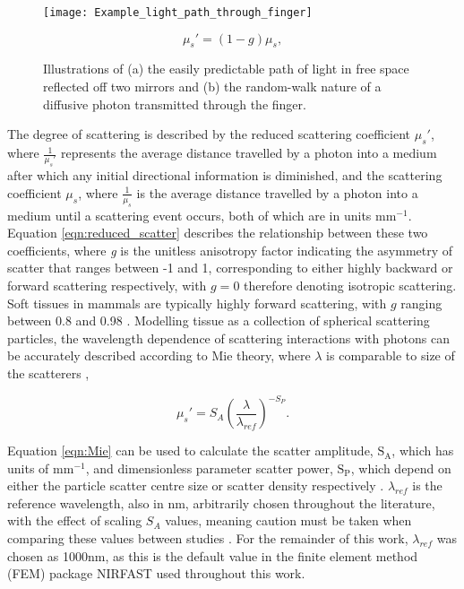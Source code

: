 \documentclass[twoside]{bhamthesis}
\theoremstyle{definition}
\begin{document}
\begin{figure}[!ht]
	\begin{minipage}{.7\textwidth}
    \centering
    \texttt{[image: Example\_light\_path\_through\_finger]}
    \caption{Illustrations of (a) the easily predictable path of light in free space reflected off two mirrors and (b) the random-walk nature of a diffusive photon transmitted through the finger.} 
    \label{fig:Random_walk}
  \end{minipage}%
  \begin{minipage}{.3\textwidth}
     \begin{equation}
\mu_s' = (1-g)\mu_s,
  \label{eqn:reduced_scatter}
    \end{equation}
  \end{minipage}
\end{figure}

The degree of scattering is described by the reduced scattering coefficient $\mu_s'$, where $\frac{1}{\mu_s'}$ represents the average distance travelled by a photon into a medium after which any initial directional information is diminished, and the scattering coefficient $\mu_s$, where $\frac{1}{\mu_s}$ is the average distance travelled by a photon into a medium until a scattering event occurs, both of which are in units mm$^{-1}$. Equation \ref{eqn:reduced_scatter} describes the relationship between these two coefficients, where \textit{g} is the unitless anisotropy factor indicating the asymmetry of scatter that ranges between -1 and 1, corresponding to either highly backward or forward scattering respectively, with $g=0$ therefore denoting isotropic scattering. Soft tissues in mammals are typically highly forward scattering, with $g$ ranging between 0.8 and 0.98 \cite{cheong1990review}. Modelling tissue as a collection of spherical scattering particles, the wavelength dependence of scattering interactions with photons can be accurately described according to Mie theory, where $\lambda$ is comparable to size of the scatterers  \cite{van1991light,mourant1997predictions},

\begin{equation}
\mu_s' = S_A \left(\frac{\lambda}{\lambda_{ref}}\right)^{-S_P}.
  \label{eqn:Mie}
\end{equation}

Equation \ref{eqn:Mie} can be used to calculate the scatter amplitude, $\mathrm{S_A}$, which has units of $\mathrm{mm^{-1}}$, and dimensionless parameter scatter power, $\mathrm{S_P}$, which depend on either the particle scatter centre size or scatter density respectively \cite{dehghani2009near}. $\lambda_{ref}$ is the reference wavelength, also in nm, arbitrarily chosen throughout the literature, with the effect of scaling $S_A$ values, meaning caution must be taken when comparing these values between studies \cite{jacques2013optical}. For the remainder of this work, $\lambda_{ref}$ was chosen as 1000nm, as this is the default value in the finite element method (FEM) package NIRFAST \cite{dehghani2009near} used throughout this work.
\end{document}
